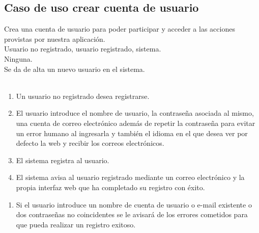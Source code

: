 \subsection*{Caso de uso crear cuenta de usuario}
 Crea una cuenta de usuario para poder
participar y acceder a las acciones provistas por nuestra aplicación.\\
 Usuario no registrado, usuario registrado,
sistema.\\
 Ninguna. \\
 Se da de alta un nuevo usuario en el
sistema. \\
\\
\begin{enumerate}
\item Un usuario no registrado desea registrarse.
\item El usuario introduce el nombre de usuario, la contraseña asociada al
  mismo, una cuenta de correo electrónico además de repetir la contraseña para
  evitar un error humano al ingresarla y también el idioma en el que desea ver
  por defecto la web y recibir los correos electrónicos.
\item El sistema registra al usuario.
\item El sistema avisa al usuario registrado mediante un correo electrónico y la
  propia interfaz web que ha completado su registro con éxito.
\end{enumerate}
\begin{enumerate}
\item Si el usuario introduce un nombre de cuenta de usuario o e-mail existente
  o dos contraseñas no coincidentes se le avisará de los errores cometidos para
  que pueda realizar un registro exitoso.
\end{enumerate}

